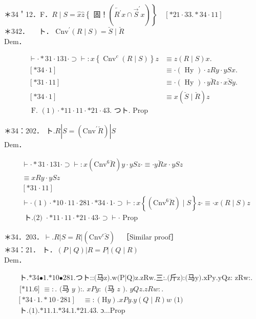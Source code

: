 \documentclass[10pt]{article}
\begin{document}
＊34＇12．F．$R \mid S=\widehat{x} \widehat{z}\left\{\right.$ 固！$\left.\left(\overleftarrow{R^{\prime}} x \cap \vec{S}^{\prime} x\right)\right\} \quad[* 21 \cdot 33 . * 34 \cdot 11]$\\
＊342．$\quad$ ト． $\mathrm{Cnv}^{\prime}(R \mid S)=\breve{S} \mid \breve{R}$\\
Dem．

\[
\begin{array}{ll}
\vdash \cdot * 31 \cdot 131 \cdot \supset \vdash: x\left\{\operatorname{Cnv}^{c}(R \mid S)\right\} z & \equiv z(R \mid S) x . \\
{[* 34 \cdot 1]} & \equiv \cdot(\text { Hy }) \cdot z R y \cdot y S x . \\
{[* 31 \cdot 11]} & \equiv \cdot(\text { Hy }) \cdot y \breve{R} z \cdot x \breve{S} y . \\
{[* 34 \cdot 1]} & \equiv x(\breve{S} \mid \breve{R}) z  \tag{1}\\
\text { F. }(1) \cdot * 11 \cdot 11 \cdot * 21 \cdot 43 . \text { つト. Prop } &
\end{array}
\]

＊34：202． ト.$R\left|S=\left(\mathrm{Cnv}^{\prime} \breve{R}\right)\right| S$\\
Dem．


\begin{align*}
& \vdash \cdot * 31 \cdot 131 \cdot \supset \vdash: x\left(\mathrm{Cnv}^{6} \breve{R}\right) y \cdot y S z \cdot \equiv \cdot y \breve{R} x \cdot y S z \\
& \equiv x R y \cdot y S z  \tag{1}\\
& {[* 31 \cdot 11] }  \tag{2}\\
& \vdash \cdot(1) \cdot * 10 \cdot 11 \cdot 281 \cdot * 34 \cdot 1 \cdot \supset \vdash: x\left\{\left(\mathrm{Cnv}^{6} \breve{R}\right) \mid S\right\} z \cdot \equiv \cdot x(R \mid S) z \\
& \text { ト.(2) } \cdot * 11 \cdot 11 \cdot * 21 \cdot 43 \cdot \supset \vdash \cdot \text { Prop }
\end{align*}


＊34．203．$\vdash . R|S=R|\left(\mathrm{Cnv}^{c} \breve{S}\right) \quad$［Similar proof］\\
＊34：21． ト．$(P \mid Q)|R=P|(Q \mid R)$\\
Dem．

$$
\begin{aligned}
& \text { ト.*34•1.*10•281.つト::(马z).w(P|Q)z.zRw.三:.(斤z):(马y).xPy.yQz: zRw:. } \\
& \text { [*11.6] } \equiv: . \text { (马 } y \text { ):. } x P y: \text { (马 } z \text { ). } y Q z . z R w: \text {. } \\
& {[* 34 \cdot 1 . * 10 \cdot 281] \quad \equiv:(\mathrm{H} y) . x P y . y(Q \mid R) w \text { (1) }} \\
& \text { ト.(1).*11.1.*34.1.*21.43. ɔ…Prop }
\end{aligned}
$$
\end{document}
